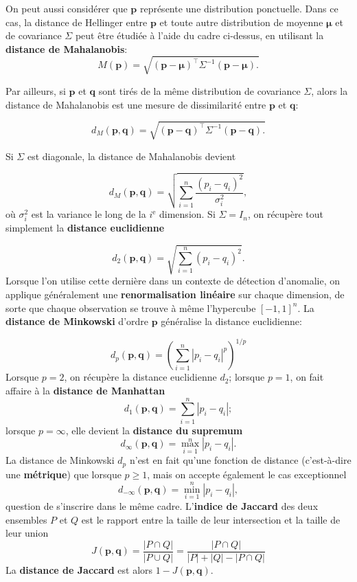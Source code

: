 On peut aussi considérer que $\mathbf{p}$ représente une distribution ponctuelle. Dans ce cas, la distance de Hellinger entre $\mathbf{p}$ et toute autre distribution de moyenne  $\mathbf{\mu}$ et de covariance $\Sigma$ peut être étudiée à l'aide du cadre ci-dessus, en utilisant la \textbf{distance de Mahalanobis}:
$$
M(\mathbf{p})=\sqrt{(\mathbf{p} - \mathbf{\mu})^{\!\top} \Sigma^{-1} (\mathbf{p} - \mathbf{\mu}).}
$$

\noindent Par ailleurs, si $\mathbf{p}$ et $\mathbf{q}$ sont tirés de la même distribution de covariance $\Sigma$, alors la distance de Mahalanobis est une mesure de dissimilarité entre $\mathbf{p}$ et $\mathbf{q}$: 

$$
d_M(\mathbf{p},\mathbf{q})=\sqrt{(\mathbf{p} - \mathbf{q})^{\!\top} \Sigma^{-1} (\mathbf{p} - \mathbf{q}).}
$$

\noindent Si  $\Sigma$ est diagonale, la distance de Mahalanobis devient 

$$
d_M(\mathbf{p},\mathbf{q})=\sqrt{\sum_{i=1}^n \frac{(p_i - q_i)^2}{\sigma_i^2}},
$$
o\`u $\sigma_i^2$ est la variance le long de la $i^{\text{e}}$ dimension.\newl
Si $\Sigma=I_n$, on récupère tout simplement la \textbf{distance euclidienne}

$$
d_2(\mathbf{p},\mathbf{q})=\sqrt{\sum_{i=1}^n (p_i - q_i)^2}.
$$
\noindent Lorsque l'on utilise cette derni\`ere dans un contexte de détection d'anomalie, on applique g\'en\'eralement une  \textbf{renormalisation linéaire} sur chaque dimension, de sorte que chaque observation se trouve \`a  m\^eme l'hypercube $[-1,1]^n$.
\newpage\noindent La  \textbf{distance de Minkowski} d'ordre $\mathbf{p}$ généralise la distance euclidienne:

$$
d_p(\mathbf{p},\mathbf{q})=\left( \sum_{i=1}^n |p_i - q_i|^p \right)^{1/p}
$$
Lorsque $p=2$, on r\'ecup\`ere la distance euclidienne $d_2$; lorsque  $p=1$, on fait affaire \`a la  \textbf{distance de Manhattan} $$d_1(\mathbf{p},\mathbf{q})=\sum_{i=1}^n|p_i-q_i|;$$ lorsque  $p=\infty$, elle devient la  \textbf{distance du supremum} $$d_{\infty}(\mathbf{p},\mathbf{q})=\max_{i=1}^n |p_i - q_i|.$$ La distance de Minkowski $d_p$ n'est en fait qu'une fonction de distance (c'est-à-dire une \textbf{m\'etrique}) que lorsque $p \geq 1$, mais on accepte \'egalement le cas exceptionnel 
$$
d_{-\infty}(\mathbf{p},\mathbf{q})=\min_{i=1}^n |p_i - q_i|,
$$
question de s'inscrire dans le même cadre. \newline\newline L'\textbf{indice de Jaccard} des deux ensembles $P$ et $Q$ est le rapport entre la taille de leur intersection et la taille de leur union
$$
J(\mathbf{p}, \mathbf{q})
= \frac{|P \cap Q|}{|P \cup Q|}
= \frac{|P \cap Q|}{|P| + |Q| - |P \cap Q|}
$$
La \textbf{distance de Jaccard} est alors $1 - J(\mathbf{p}, \mathbf{q})$.

